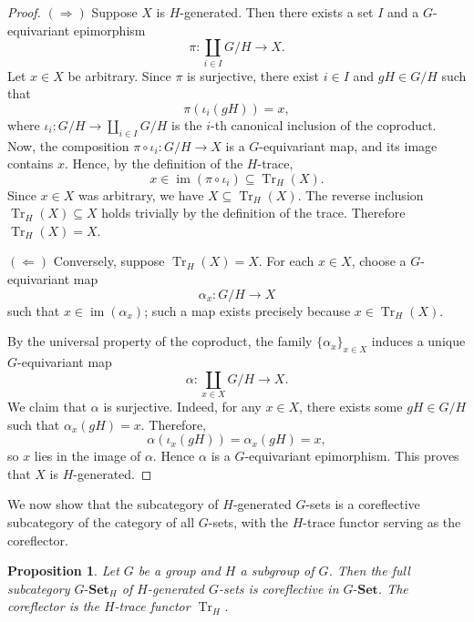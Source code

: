 \documentclass{amsart}
\newtheorem{proposition}{Proposition}
\begin{document}
\begin{proof}
$(\Rightarrow)$ Suppose $X$ is $H$-generated. Then there exists a set $I$ and a $G$-equivariant epimorphism
\[
\pi \colon \coprod_{i \in I} G/H \longrightarrow X.
\]
Let $x \in X$ be arbitrary. Since $\pi$ is surjective, there exist $i \in I$ and $gH \in G/H$ such that
\[
\pi(\iota_i(gH)) = x,
\]
where $\iota_i \colon G/H \longrightarrow \coprod_{i \in I} G/H$ is the $i$-th canonical inclusion of the coproduct.
Now, the composition $\pi \circ \iota_i \colon G/H \longrightarrow X$ is a $G$-equivariant map, and its image contains $x$. Hence, by the definition of the $H$-trace,
\[
x \in \operatorname{im}(\pi \circ \iota_i) \subseteq \operatorname{Tr}_H(X).
\]
Since $x \in X$ was arbitrary, we have $X \subseteq \operatorname{Tr}_H(X)$. The reverse inclusion $\operatorname{Tr}_H(X) \subseteq X$ holds trivially by the definition of the trace. Therefore $\operatorname{Tr}_H(X) = X$.

$(\Leftarrow)$ Conversely, suppose $\operatorname{Tr}_H(X) = X$. For each $x \in X$, choose a $G$-equivariant map
\[
\alpha_x \colon G/H \longrightarrow X
\]
such that $x \in \operatorname{im}(\alpha_x)$; such a map exists precisely because $x \in \operatorname{Tr}_H(X)$.

By the universal property of the coproduct, the family $\{\alpha_x\}_{x \in X}$ induces a unique $G$-equivariant map
\[
\alpha \colon \coprod_{x \in X} G/H \longrightarrow X.
\]
We claim that $\alpha$ is surjective. Indeed, for any $x \in X$, there exists some $gH \in G/H$ such that $\alpha_x(gH) = x$. Therefore,
\[
\alpha(\iota_x(gH)) = \alpha_x(gH) = x,
\]
so $x$ lies in the image of $\alpha$. Hence $\alpha$ is a $G$-equivariant epimorphism. This proves that $X$ is $H$-generated.
\end{proof}

We now show that the subcategory of $H$-generated $G$-sets is a coreflective subcategory of the category of all $G$-sets, with the $H$-trace functor serving as the coreflector.

\begin{proposition}\label{prop:tr_coreflector}
Let $G$ be a group and $H$ a subgroup of $G$. Then the full subcategory $G\text{-}\mathbf{Set}_H$ of $H$-generated $G$-sets is coreflective in $G\text{-}\mathbf{Set}$. The coreflector is the $H$-trace functor $\operatorname{Tr}_H$.
\end{proposition}
\end{document}
